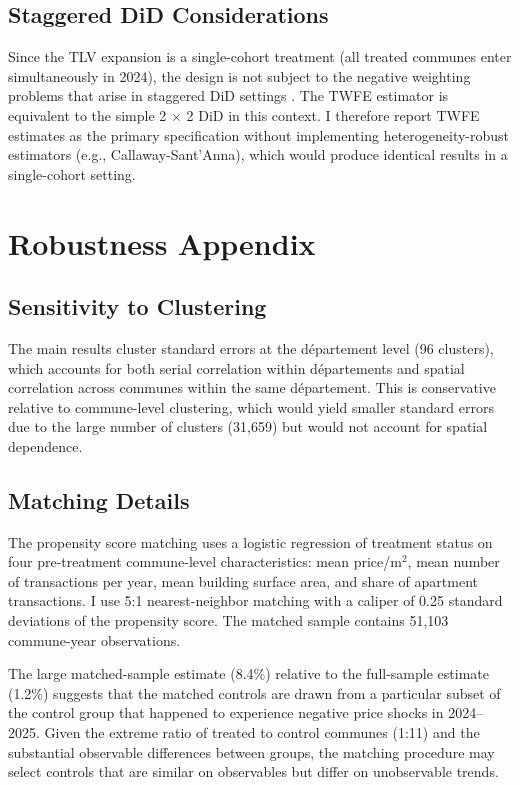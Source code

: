 \documentclass[12pt]{article}
\begin{document}
{\subsection{Staggered DiD Considerations}

Since the TLV expansion is a single-cohort treatment (all treated communes enter simultaneously in 2024), the design is not subject to the negative weighting problems that arise in staggered DiD settings \citep{goodman2021, callaway2021}. The TWFE estimator is equivalent to the simple 2 $\times$ 2 DiD in this context. I therefore report TWFE estimates as the primary specification without implementing heterogeneity-robust estimators (e.g., Callaway-Sant'Anna), which would produce identical results in a single-cohort setting.


\section{Robustness Appendix}
\label{app:robustness}

\subsection{Sensitivity to Clustering}

The main results cluster standard errors at the d\'epartement level (96 clusters), which accounts for both serial correlation within d\'epartements and spatial correlation across communes within the same d\'epartement. This is conservative relative to commune-level clustering, which would yield smaller standard errors due to the large number of clusters (31,659) but would not account for spatial dependence.

\subsection{Matching Details}

The propensity score matching uses a logistic regression of treatment status on four pre-treatment commune-level characteristics: mean price/m$^2$, mean number of transactions per year, mean building surface area, and share of apartment transactions. I use 5:1 nearest-neighbor matching with a caliper of 0.25 standard deviations of the propensity score. The matched sample contains 51,103 commune-year observations.

The large matched-sample estimate (8.4\%) relative to the full-sample estimate (1.2\%) suggests that the matched controls are drawn from a particular subset of the control group that happened to experience negative price shocks in 2024--2025. Given the extreme ratio of treated to control communes (1:11) and the substantial observable differences between groups, the matching procedure may select controls that are similar on observables but differ on unobservable trends.

}
\end{document}

